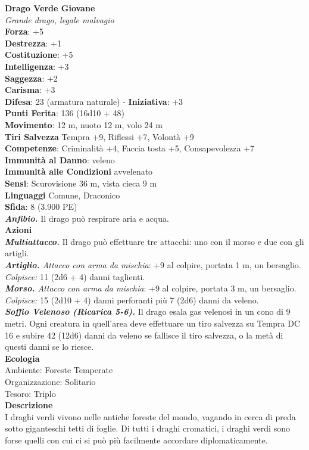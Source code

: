 \begin{multicols}{2}
\medskip\textbf{Drago Verde Giovane}\\
\emph{Grande drago, legale malvagio}\\
\textbf{Forza}: +5\\
\textbf{Destrezza}: +1\\
\textbf{Costituzione}: +5\\
\textbf{Intelligenza}: +3\\
\textbf{Saggezza}: +2\\
\textbf{Carisma}: +3\\
\textbf{Difesa}: 23 (armatura naturale) - \textbf{Iniziativa}: +3\\
\textbf{Punti Ferita}: 136 (16d10 + 48)\\
\textbf{Movimento}: 12 m, nuoto 12 m, volo 24 m\\
\textbf{Tiri Salvezza} Tempra +9, Riflessi +7, Volontà +9\\
\textbf{Competenze}: Criminalità +4, Faccia tosta +5, Consapevolezza +7\\
\textbf{Immunità al Danno}: veleno\\
\textbf{Immunità alle Condizioni} avvelenato\\
\textbf{Sensi}: Scurovisione 36 m, vista cieca 9 m \\
\textbf{Linguaggi} Comune, Draconico\\
\textbf{Sfida}: 8 (3.900 PE)\smallskip\\
\emph{\textbf{Anfibio.}} Il drago può respirare aria e acqua. \\
\smallskip\textbf{Azioni}\\
\emph{\textbf{Multiattacco.}} Il drago può effettuare tre attacchi: uno con il morso e due con gli artigli.\\
\emph{\textbf{Artiglio.} Attacco con arma da mischia}: +9 al colpire, portata 1 m, un bersaglio.\\
\emph{Colpisce:} 11 (2d6 + 4) danni taglienti.\\
\emph{\textbf{Morso.} Attacco con arma da mischia}: +9 al colpire, portata 3 m, un bersaglio.\\
\emph{Colpisce:} 15 (2d10 + 4) danni perforanti più 7 (2d6) danni da veleno.\\
\emph{\textbf{Soffio Velenoso (Ricarica 5-6).}} Il drago esala gas velenosi in un cono di 9 metri. Ogni creatura in quell'area deve effettuare un tiro salvezza su Tempra DC  16 e subire 42 (12d6) danni da veleno se fallisce il tiro salvezza, o la metà di questi danni se lo riesce.\\
\textbf{Ecologia}\\
Ambiente: Foreste Temperate\\
Organizzazione: Solitario\\
Tesoro: Triplo\\
\textbf{Descrizione}\\
I draghi verdi vivono nelle antiche foreste del mondo, vagando in cerca di preda sotto giganteschi tetti di foglie. Di tutti i draghi cromatici, i draghi verdi sono forse quelli con cui ci si può più facilmente accordare diplomaticamente.\\


\end{multicols}
